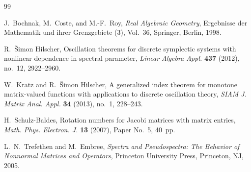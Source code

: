 \documentclass[11pt]{article}
\begin{document}
\begin{thebibliography}{99}

J.~Bochnak, M.~Coste, and M.-F.~Roy,
\newblock \emph{Real Algebraic Geometry},
\newblock Ergebnisse der Mathematik und ihrer Grenzgebiete (3), Vol.~36,
Springer, Berlin, 1998.

R.~{\v S}imon Hilscher,
\newblock Oscillation theorems for discrete symplectic systems with nonlinear dependence in spectral parameter,
\newblock \emph{Linear Algebra Appl.} \textbf{437} (2012), no.~12, 2922--2960.

W.~Kratz and R.~{\v S}imon Hilscher,
\newblock A generalized index theorem for monotone matrix-valued functions with applications to discrete oscillation theory,
\newblock \emph{SIAM J. Matrix Anal. Appl.} \textbf{34} (2013), no.~1, 228--243.

H.~Schulz-Baldes,
\newblock Rotation numbers for Jacobi matrices with matrix entries,
\newblock \emph{Math. Phys. Electron. J.} \textbf{13} (2007), Paper No.~5, 40~pp.

L.~N.~Trefethen and M.~Embree,
\newblock \emph{Spectra and Pseudospectra: The Behavior of Nonnormal Matrices and Operators},
\newblock Princeton University Press, Princeton, NJ, 2005.

\end{thebibliography}
\end{document}
